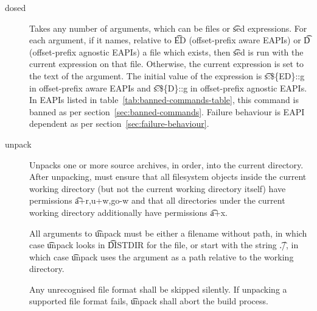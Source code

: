 \begin{description}
\item[dosed] Takes any number of arguments, which can be files or \t{sed} expressions. For each
    argument, if it names, relative to \t{ED} (offset-prefix aware EAPIs) or \t{D} (offset-prefix agnostic
    EAPIs) a file which exists, then \t{sed} is run with the current expression on that file. Otherwise,
    the current expression is set to the text of the argument. The initial value of the expression is
    \t{s:\$\{ED\}::g} in offset-prefix aware EAPIs and \t{s:\$\{D\}::g} in offset-prefix agnostic
    EAPIs. In EAPIs listed in table~\ref{tab:banned-commands-table}, this command is banned as per
    section~\ref{sec:banned-commands}. Failure behaviour is EAPI dependent as per
    section~\ref{sec:failure-behaviour}.

\item[unpack] Unpacks one or more source archives, in order, into the current directory. After
    unpacking, must ensure that all filesystem objects inside the current working directory (but not
    the current working directory itself) have permissions \t{a+r,u+w,go-w} and that all directories
    under the current working directory additionally have permissions \t{a+x}.

    All arguments to \t{unpack} must be either a filename without path, in which case \t{unpack}
    looks in \t{DISTDIR} for the file, or start with the string \t{./}, in which case \t{unpack}
    uses the argument as a path relative to the working directory.

    Any unrecognised file format shall be skipped silently. If unpacking a supported file format
    fails, \t{unpack} shall abort the build process.


\end{description}
